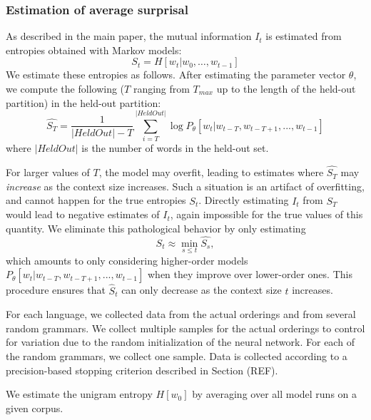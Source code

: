\documentclass[11pt,letterpaper]{article}
\newcommand\mhahn[1]{{\color{red}(#1)}}
\newcounter{theorem}
\begin{document}
\subsubsection{Estimation of average surprisal}

As described in the main paper, the mutual information $I_t$ is estimated from entropies obtained with Markov models:
\begin{equation*}
    S_t = H[w_t | w_0, \dots, w_{t-1}]
\end{equation*}
We estimate these entropies as follows.
After estimating the parameter vector $\theta$, we compute the following ($T$ ranging from $T_{max}$ up to the length of the held-out partition) in the held-out partition:
\begin{equation}
\widehat{S_T} =	\frac{1}{|HeldOut|-T} \sum_{i=T}^{|HeldOut|} \log P_\theta[w_t | w_{t-T}, w_{t-T+1}, ..., w_{t-1}]
\end{equation}
where $|HeldOut|$ is the number of words in the held-out set.

For larger values of $T$, the model may overfit, leading to estimates where $\widehat{S_T}$ may \emph{increase} as the context size increases.
Such a situation is an artifact of overfitting, and cannot happen for the true entropies $S_t$.
Directly estimating $I_t$ from $\widehat{S_T}$ would lead to negative estimates of $I_t$, again impossible for the true values of this quantity.
We eliminate this pathological behavior by only estimating
\begin{equation}
S_t \approx \min_{s \leq t} \widehat{S_s},
\end{equation}
which amounts to only considering higher-order models $P_\theta[w_t | w_{t-T}, w_{t-T+1}, ..., w_{t-1}]$ when they improve over lower-order ones.
This procedure ensures that $\hat{S}_t$ can only decrease as the context size $t$ increases.


For each language, we collected data from the actual orderings and from several random grammars.
We collect multiple samples for the actual orderings to control for variation due to the random initialization of the neural network.
For each of the random grammars, we collect one sample.
Data is collected according to a precision-based stopping criterion described in Section (REF).


We estimate the unigram entropy $H[w_0]$ by averaging over all model runs on a given corpus.



\end{document}
